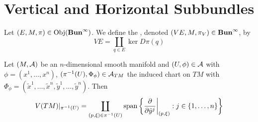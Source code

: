 \documentclass{book}
\begin{document}
	
	
	
	
	
	
	
	
	
	
	
	
	
	
	
	
	
	
	
	
	
	\newpage
	\section{Vertical and Horizontal Subbundles}
	
	\begin{defn}
		Let $(E, M, \pi) \in \operatorname{Obj}(\operatorname*{\text{\textbf{Bun}}^{\infty}})$. We define the , denoted $(VE, M, \pi_{V}) \in \operatorname*{\text{\textbf{Bun}}^{\infty}}$, by 
		$$VE = \coprod_{q \in E} \ker D\pi(q)$$
	\end{defn}
	
	
	\begin{ex}
		Let $(M, \mathcal{A})$ be an $n$-dimensional smooth manifold and $(U, \phi) \in \mathcal{A}$ with $\phi = (x^1, \ldots, x^n)$,  $(\pi^{-1}(U), \Phi_{\phi}) \in \mathcal{A}_{TM}$ the induced chart on $TM$ with $\Phi_{\phi} = (\tilde{x}^1, \ldots, \tilde{x}^n,  \tilde{y}^1, \ldots, \tilde{y}^n)$. Then 
		$$V(TM)|_{\pi^{-1}(U)} = \coprod_{(p, \xi) \in \pi^{-1}(U)} \operatorname{span} \bigg \{ \frac{\partial}{\partial \tilde{y}^j} \bigg|_{(p, \xi)}: j \in \{1, \ldots, n\} \bigg \}$$
	\end{ex}
	
\end{document}
